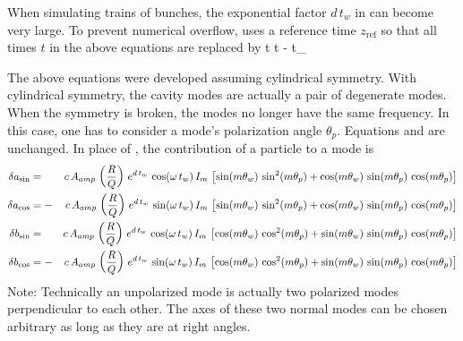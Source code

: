 When simulating trains of bunches, the exponential factor $d \, t_w$ in  can
become very large. To prevent numerical overflow, \bmad uses a reference time $z_{\text{ref}}$ so
that all times $t$ in the above equations are replaced by
\Begineq
  t \longrightarrow t - t_{}
  \label{ttt}
\Endeq

The above equations were developed assuming cylindrical symmetry. With cylindrical symmetry, the
cavity modes are actually a pair of degenerate modes. When the symmetry is broken, the modes no
longer have the same frequency. In this case, one has to consider a mode's polarization angle
$\theta_p$. Equations  and  are unchanged.  In place of , the
contribution of a particle to a mode is
\begin{alignat}{2}
  \delta a_{\sin} &=  & c \, A_{amp} \, \left( \frac{R}{Q} \right) \,
    e^{d \, t_w} \, \cos (\omega \, t_w) \, I_m \, \left[
    \sin(m \theta_w) \, \sin^2(m \theta_p) + 
    \cos(m \theta_w) \, \sin(m \theta_p) \, \cos(m\theta_p) \right]
    \nonumber \\
  \delta a_{\cos} &= -& c \, A_{amp} \, \left( \frac{R}{Q} \right) \,
    e^{d \, t_w} \, \sin (\omega \, t_w) \, I_m \, \left[ 
    \sin(m \theta_w) \, \sin^2(m \theta_p) + 
    \cos(m \theta_w) \, \sin(m \theta_p) \, \cos(m\theta_p) \right]
    \\
  \delta b_{\sin} &=  & c \, A_{amp} \, \left( \frac{R}{Q} \right) \,
    e^{d \, t_w} \, \cos (\omega \, t_w) \, I_m \, \left[
    \cos(m \theta_w) \, \cos^2(m \theta_p) + 
    \sin(m \theta_w) \, \sin(m \theta_p) \, \cos(m\theta_p) \right]
    \nonumber \\
  \delta b_{\cos} &= -& c \, A_{amp} \, \left( \frac{R}{Q} \right) \,
    e^{d \, t_w} \, \sin (\omega \, t_w) \, I_m \, \left[
    \cos(m \theta_w) \, \cos^2(m \theta_p) + 
    \sin(m \theta_w) \, \sin(m \theta_p) \, \cos(m\theta_p) \right]
    \nonumber
\end{alignat}
Note: Technically an unpolarized mode is actually two polarized modes perpendicular to each
other. The axes of these two normal modes can be chosen arbitrary as long as they are at
right angles.
